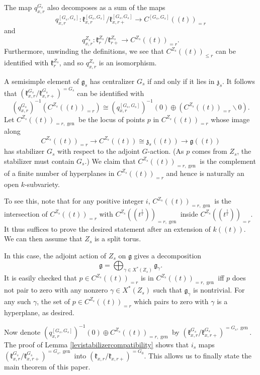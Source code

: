 \documentclass[12pt]{article}
\newcommand{\on}{\operatorname}
\theoremstyle{remark}
\begin{document}
The map $q_{x,r}^{G_s}$ also decomposes as a sum of the maps
\[
q_{x,r}^{[G_s,G_s]}:\mathfrak{k}_{x,r}^{[G_s,G_s]}/\mathfrak{k}_{x,r+}^{[G_s,G_s]}\rightarrow C^{[G_s,G_s]}((t))_{=r}
\]
and
\[
q_{x,r}^{Z_s}:\mathfrak{k}_r^{Z_s}/\mathfrak{k}_{r+}^{Z_s}\rightarrow C^{Z_s}((t))_{=r}.
\]
Furthermore, unwinding the definitions, we see that $C^{Z_s}((t))_{\leq r}$ can be identified with $\mathfrak{k}_r^{Z_s}$, and so $q_{x,r}^{Z_s}$ is an isomorphism.

A semisimple element of $\mathfrak{g}_s$ has centralizer $G_s$ if and only if it lies in $\mathfrak{z}_s$. It follows that $(\mathfrak{k}_{x,r}^{G_s}/\mathfrak{k}_{x,r+}^{G_s})^{=G_s}$ can be identified with 
\[
(q_{x,r}^{G_s})^{-1}(C^{Z_s}((t))_{=r})\cong (q_{x,r}^{[G_s,G_s]})^{-1}(0)\oplus(C^{Z_s}((t))_{=r}\backslash 0).
\]
Let $C^{Z_s}((t))_{=r,\on{gen}}$ be the locus of points $p$ in $C^{Z_s}((t))_{=r}$ whose image along 
\[
C^{Z_s}((t))_{=r}\rightarrow C^{Z_s}((t))\cong\mathfrak{z}_s((t))\rightarrow\mathfrak{g}((t))
\]
has stabilizer $G_s$ with respect to the adjoint $G$-action. (As $p$ comes from $Z_s$, the stabilizer must contain $G_s$.) We claim that $C^{Z_s}((t))_{=r,\on{gen}}$ is the complement of a finite number of hyperplanes in $C^{Z_s}((t))_{=r}$ and hence is naturally an open $k$-subvariety.

To see this, note that for any positive integer $i$, $C^{Z_s}((t))_{=r,\on{gen}}$ is the intersection of $C^{Z_s}((t))_{=r}$ with $C^{Z_s}((t^{\frac{1}{i}}))_{=r,\on{gen}}$ inside $C^{Z_s}((t^{\frac{1}{i}}))_{=r}$. It thus suffices to prove the desired statement after an extension of $k((t))$. We can then assume that $Z_s$ is a split torus. 

In this case, the adjoint action of $Z_s$ on $\mathfrak{g}$ gives a decomposition
\[
\mathfrak{g}=\displaystyle\bigoplus_{\gamma\in X^*(Z_s)}\mathfrak{g}_{\gamma}.
\]
It is easily checked that $p\in C^{Z_s}((t))_{=r}$ is in $C^{Z_s}((t))_{=r,\on{gen}}$ iff $p$ does not pair to zero with any nonzero $\gamma\in X^*(Z_s)$ such that $\mathfrak{g}_{\gamma}$ is nontrivial. For any such $\gamma$, the set of $p\in C^{Z_s}((t))_{=r}$ which pairs to zero with $\gamma$ is a hyperplane, as desired.

Now denote $(q_{x,r}^{[G_s,G_s]})^{-1}(0)\oplus C^{Z_s}((t))_{=r,\on{gen}}$ by $(\mathfrak{k}_{x,r}^{G_s}/\mathfrak{k}_{x,r+}^{G_s})^{=G_s,\on{gen}}.$ The proof of Lemma \ref{levistabilizercompatibility} shows that $i_s$ maps $(\mathfrak{k}_{x,r}^{G_s}/\mathfrak{k}_{x,r+}^{G_s})^{=G_s,\on{gen}}$ into $(\mathfrak{k}_{x,r}/\mathfrak{k}_{x,r+})^{=G_0}$. This allows us to finally state the main theorem of this paper.
\end{document}
